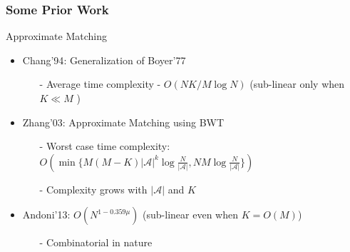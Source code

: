\documentclass[10pt,xcolor=table]{beamer}
\newcommand{\mc}{\mathcal}
\begin{document}
\begin{frame} \frametitle{Some Prior Work}
	\vspace{-0.2cm}
	\begin{block}{\alert{Approximate Matching}}
		
	 	\begin{itemize}
	 		\item {Chang'94}: Generalization of Boyer'77
	 		\begin{itemize}
	 			\item[-] Average time complexity - $O(NK/M \log N)$ (sub-linear only when $K \ll M$ )
	 		\end{itemize}
	 		
	 		\item {Zhang'03}: Approximate Matching using BWT
	 			\begin{itemize}
	 				\item[-] Worst case time complexity: $O(\min\{M(M-K){|\mc{A}|}^k\log \frac{N}{|\mc{A}|} , NM \log \frac{N}{|\mc{A}|}\})$
	 				\item[-] Complexity grows with $|\mc{A}|$ and $K$
	 			\end{itemize}
	 		\pause	
	 		\item {Andoni'13}: $O\left(N^{1-0.359\mu}\right)$ (sub-linear even when $K = O(M)$)
	 		\begin{itemize}
	 			\item[-] Combinatorial in nature
	 		\end{itemize}
	 	\end{itemize}
	 	
	 \end{block}
\end{frame}
	
\end{document}
